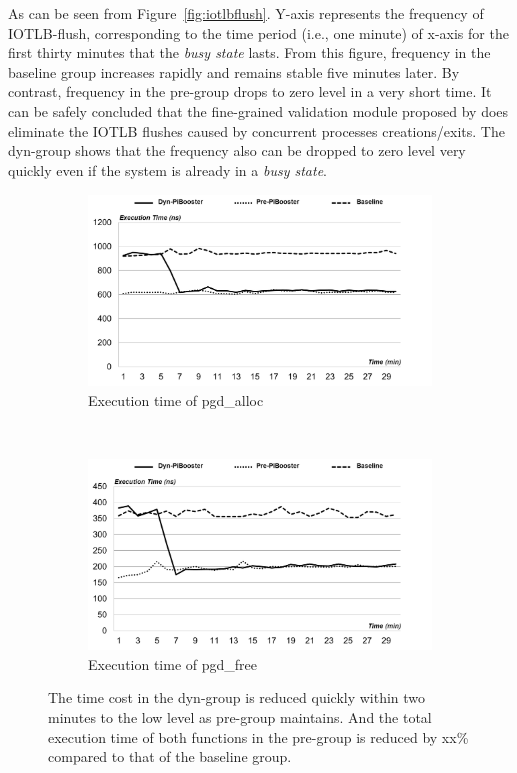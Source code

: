 As can be seen from Figure~\ref{fig:iotlbflush}. Y-axis represents the frequency of IOTLB-flush, corresponding to the time period (i.e., one minute) of x-axis for the first thirty minutes that the \emph{busy state} lasts. From this figure, frequency in the baseline group increases rapidly and remains stable five minutes later. By contrast, frequency in the pre-\name group drops to zero level in a very short time. It can be safely concluded that the fine-grained validation module proposed by \name does eliminate the IOTLB flushes caused by concurrent processes creations/exits. The dyn-\name group shows that the frequency also can be dropped to zero level very quickly even if the system is already in a \emph{busy state}.

\begin{figure}[t!]
    \centering
    \begin{subfigure}[t]{0.5\textwidth}
        \centering
        \includegraphics[height=2.0in]{image/micro/PGDalloc.png}
        \caption{Execution time of pgd\_alloc}
        \label{fig:subfig:a}
    \end{subfigure}%
    ~
    \begin{subfigure}[t]{0.5\textwidth}
        \centering
        \includegraphics[height=2.0in]{image/micro/PGDfree.png}
        \caption{Execution time of pgd\_free}
        \label{fig:subfig:b}
    \end{subfigure}
    \caption{The time cost in the dyn-\name group is reduced quickly within two minutes to the low level as pre-\name group maintains. And the total execution time of both functions in the pre-\name group is reduced by xx\% compared to that of the baseline group.}
    \label{fig:PGDtime}
\end{figure}

